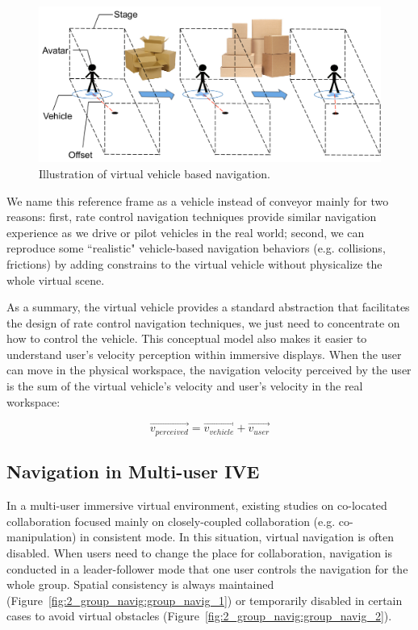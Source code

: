 \begin{figure}[htb]
  \centering
  \includegraphics[width=.8\textwidth]{figures/ch2/vehicle}
  \caption{\label{fig:2_vehicle}Illustration of virtual vehicle based navigation.}
\end{figure}

We name this reference frame as a vehicle instead of conveyor mainly for two reasons: first, rate control navigation techniques provide similar navigation experience as we drive or pilot vehicles in the real world; second, we can reproduce some ``realistic" vehicle-based navigation behaviors (e.g. collisions, frictions) by adding constrains to the virtual vehicle without physicalize the whole virtual scene.

As a summary, the virtual vehicle provides a standard abstraction that facilitates the design of rate control navigation techniques, we just need to concentrate on how to control the vehicle. This conceptual model also makes it easier to understand user's velocity perception within immersive displays. When the user can move in the physical workspace, the navigation velocity perceived by the user is the sum of the virtual vehicle's velocity and user's velocity in the real workspace: 

\begin{equation}
\overrightarrow{v_{perceived}} = \overrightarrow{v_{vehicle}} + \overrightarrow{v_{user}}
\end{equation}


\subsection{Navigation in Multi-user IVE}
In a multi-user immersive virtual environment, existing studies on co-located collaboration focused mainly on closely-coupled collaboration (e.g. co-manipulation) in consistent mode. In this situation, virtual navigation is often disabled. When users need to change the place for collaboration, navigation is conducted in a leader-follower mode that one user controls the navigation for the whole group. Spatial consistency is always maintained \citep{Beck2013IGG} (Figure~\ref{fig:2_group_navig:group_navig_1}) or temporarily disabled \citep{Kulik2011CSS} in certain cases to avoid virtual obstacles (Figure~\ref{fig:2_group_navig:group_navig_2}).

